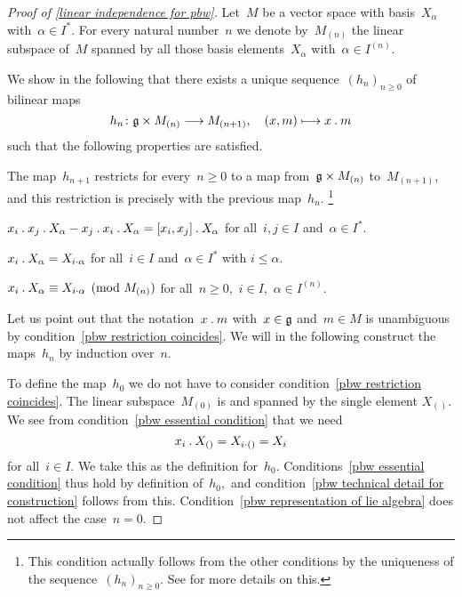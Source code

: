 \begin{proof}[Proof of \cref{linear independence for pbw}]
	Let~$M$ be a vector space with basis~$X_\alpha$ with~$\alpha \in I^*$.
	For every natural number~$n$ we denote by~$M_{(n)}$ the linear subspace of~$M$ spanned by all those basis elements~$X_\alpha$ with~$\alpha \in I^{(n)}$.

	We show in the following that there exists a unique sequence~$(h_n)_{n \geq 0}$ of bilinear maps
	\[
		h_n
		\colon
		\glie \times M_{(n)}
		\to
		M_{(n+1)},
		\quad
		(x, m)
		\mapsto
		x \act m
	\]
	such that the following properties are satisfied.
	\begin{enumerate*}
		\item
			\label{pbw restriction coincides}
			The map~$h_{n+1}$ restricts for every~$n \geq 0$ to a map from~$\mathfrak{g} \times M_{(n)}$ to~$M_{(n+1)}$, and this restriction is precisely with the previous map~$h_n$.%
			\footnote{
				This condition actually follows from the other conditions by the uniqueness of the sequence~$(h_n)_{n \geq 0}$.
				See \cite[\S 17.4]{humphreys} for more details on this.
			}
		\item
			\label{pbw representation of lie algebra}
			$x_i \mathbin{.} x_j \mathbin{.} X_\alpha - x_j \mathbin{.} x_i \mathbin{.} X_\alpha = [x_i, x_j] \mathbin{.} X_\alpha$ for all~$i,j \in I$ and~$\alpha \in I^*$.
		\item
			\label{pbw essential condition}
			$x_i \mathbin{.} X_\alpha = X_{i \cdot \alpha}$ for all~$i \in I$ and~$\alpha \in I^*$ with $i \leq \alpha$.
		\item
			\label{pbw technical detail for construction}
			$x_i \mathbin{.} X_\alpha \equiv X_{i \cdot \alpha} \pmod{M_{(n)}}$ for all~$n \geq 0$,~$i \in I$,~$\alpha \in I^{(n)}$.
	\end{enumerate*}

	Let us point out that the notation~$x \mathbin{.} m$ with~$x \in \mathfrak{g}$ and~$m \in M$ is unambiguous by condition~\ref{pbw restriction coincides}.
	We will in the following construct the maps~$h_n$ by induction over~$n$.
	
	To define the map~$h_0$ we do not have to consider condition~\ref{pbw restriction coincides}.
	The linear subspace~$M_{(0)}$ is {\onedimensional} and spanned by the single element $X_{()}$.
	We see from condition~\ref*{pbw essential condition} that we need
	\[
		x_i \mathbin{.} X_{()}
		=
		X_{i \cdot ()}
		=
		X_i
	\]
	for all~$i \in I$.
	We take this as the definition for~$h_0$.
	Conditions~\ref{pbw essential condition} thus hold by definition of~$h_0$,~and condition~\ref{pbw technical detail for construction} follows from this.
	Condition~\ref{pbw representation of lie algebra} does not affect the case~$n = 0$.


\end{proof}
